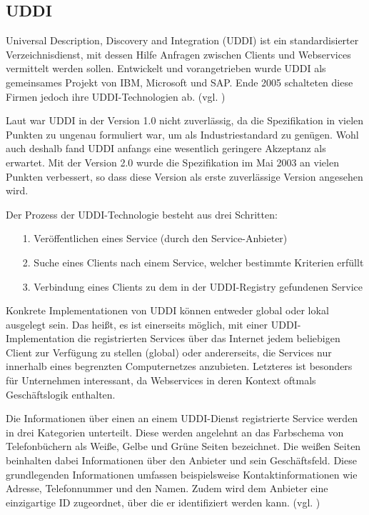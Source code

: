 \documentclass[conference,compsoc]{IEEEtran}
\begin{document}
\subsection{UDDI}

Universal Description, Discovery and Integration (UDDI) ist ein standardisierter Verzeichnisdienst, mit dessen Hilfe Anfragen zwischen Clients und Webservices vermittelt werden sollen. Entwickelt und vorangetrieben wurde UDDI als gemeinsames Projekt von IBM, Microsoft und SAP. Ende 2005 schalteten diese Firmen jedoch ihre UDDI-Technologien ab. (vgl. \cite{UDDI-Variability})

Laut \cite{UDDI-Variability} war UDDI in der Version 1.0 nicht zuverlässig, da die Spezifikation in vielen Punkten zu ungenau formuliert war, um als Industriestandard zu genügen. Wohl auch deshalb fand UDDI anfangs eine wesentlich geringere Akzeptanz als erwartet. Mit der Version 2.0 wurde die Spezifikation im Mai 2003 an vielen Punkten verbessert, so dass diese Version als erste zuverlässige Version angesehen wird.

Der Prozess der UDDI-Technologie besteht aus drei Schritten:
\begin{itemize}
\item[1.] Veröffentlichen eines Service (durch den Service-Anbieter)
\item[2.] Suche eines Clients nach einem Service, welcher bestimmte Kriterien erfüllt
\item[3.] Verbindung eines Clients zu dem in der UDDI-Registry gefundenen Service
\end{itemize}

Konkrete Implementationen von UDDI können entweder global oder lokal ausgelegt sein. Das heißt, es ist einerseits möglich, mit einer UDDI-Implementation die registrierten Services über das Internet jedem beliebigen Client zur Verfügung zu stellen (global) oder andererseits, die Services nur innerhalb eines begrenzten Computernetzes anzubieten. Letzteres ist besonders für Unternehmen interessant, da Webservices in deren Kontext oftmals Geschäftslogik enthalten.

Die Informationen über einen an einem UDDI-Dienst registrierte Service werden in drei Kategorien unterteilt. Diese werden angelehnt an das Farbschema von Telefonbüchern als Weiße, Gelbe und Grüne Seiten bezeichnet. Die weißen Seiten beinhalten dabei Informationen über den Anbieter und sein Geschäftsfeld. Diese grundlegenden Informationen umfassen beispielsweise Kontaktinformationen wie Adresse, Telefonnummer und den Namen. Zudem wird dem Anbieter eine einzigartige ID zugeordnet, über die er identifiziert werden kann. (vgl. \cite{UDDI-implementation})
\end{document}
